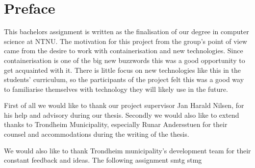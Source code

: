 \chapter*{Preface} %
\label{chap:preface}

This bachelors assignment is written as the finalisation of our degree in computer science at NTNU. The motivation for this project from the group's point of view came from the desire to work with containerisation and new technologies. Since containerisation is one of the big new buzzwords this was a good opportunity to get acquainted with it. There is little focus on new technologies like this in the students' curriculum, so the participants of the project felt this was a good way to familiarise themselves with technology they will likely use in the future.


First of all we would like to thank our project supervisor Jan Harald Nilsen, for his help and advisory during our thesis. Secondly we would also like to extend thanks to Trondheim Municipality, especially Runar Andersstuen for their counsel and accommodations during the writing of the thesis. 

We would also like to thank Trondheim municipality's development team for their constant feedback and ideas.
The following assignment smtg stmg
